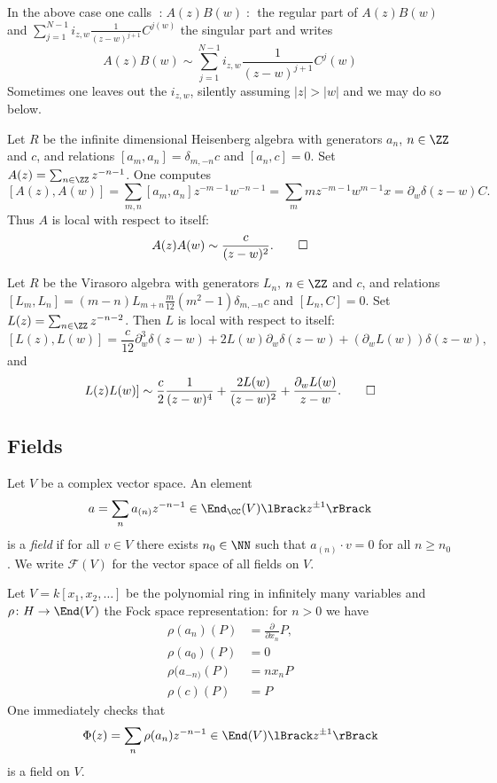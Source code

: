 \documentclass{ck-article}
\newcommand{\normord}[1]{\mathopen{:}#1\mathclose{:}}
\begin{document}
In the above case one calls $\normord{A(z)B(w)}$ the regular part of $A(z)B(w)$ and $\sum_{j=1}^{N-1} i_{z,w}\frac{1}{(z-w)^{j+1}} C^{j(w)}$ the singular part and writes
\[
    A(z)B(w) \sim \sum_{j=1}^{N-1} i_{z,w}\frac{1}{(z-w)^{j+1}} C^j(w)
\]
Sometimes one leaves out the $i_{z,w}$, silently assuming $|z| > |w|$ and we may do so below.

\begin{Example}
    Let $R$ be the infinite dimensional Heisenberg algebra with generators $a_n$, $n \in \ZZ$ and $c$, and relations $[a_m, a_n] = \delta_{m,-n}c$ and $[a_n, c] = 0$.
    Set $A(z) = \sum_{n \in \ZZ} z^{-n-1}$.
    One computes
    \[
        [A(z), A(w)] = \sum_{m, n} [a_m, a_n] z^{-m-1}w^{-n-1} = \sum_m m z^{-m-1}w^{m-1}x = \partial_w\delta(z-w)C.
    \]
    Thus $A$ is local with respect to itself:
    \[
        A(z)A(w) \sim \frac{c}{(z-w)^2}.
        \qedhere
    \]
\end{Example}

\begin{Example}
    Let $R$ be the Virasoro algebra with generators $L_n$, $n \in \ZZ$ and $c$, and relations $[L_m,L_n] = (m-n)L_{m+n} \frac{m}{12}(m^2-1)\delta_{m,-n}c$ and $[L_n, C] = 0$.
    Set $L(z) = \sum_{n \in \ZZ} z^{-n-2}$.
    Then $L$ is local with respect to itself:
    \[
        [L(z), L(w)] =
        \frac{c}{12} \partial_w^3\delta(z-w) + 2L(w)\partial_w\delta(z-w) + (\partial_wL(w))\delta(z-w),
    \]
    and
    \[
        L(z)L(w)] \sim
        \frac{c}{2} \frac{1}{(z-w)^4} + \frac{2L(w)}{(z-w)^2} + \frac{\partial_wL(w)}{z-w}.
        \qedhere
    \]
\end{Example}

\subsection{Fields}

\begin{Definition}
    Let $V$ be a complex vector space.
    An element
    \[
        a = \sum_n a_{(n)} z^{-n-1} \in \End_\CC(V)\lBrack z^{\pm1} \rBrack
    \]
    is a \emph{field} if for all $v \in V$ there exists $n_0 \in \NN$ such that $a_{(n)} \cdot v = 0$ for all $n \ge n_0$.
    We write $\mathcal F(V)$ for the vector space of all fields on $V$.
\end{Definition}

\begin{Example}\label{ex:heisenberg_field}
    Let $V = k[x_1,x_2,\dots]$ be the polynomial ring in infinitely many variables and $\rho\colon H \to \End(V)$ the Fock space representation:
    for $n > 0$ we have
    \begin{align*}
        \rho(a_n)(P) &= \frac{\partial}{\partial x_n}P, \\
        \rho(a_0)(P) & = 0 \\
        \rho(a_{-n)}(P) & = nx_nP \\
        \rho(c)(P) & = P
    \end{align*}
    One immediately checks that
    \[
        \Phi(z) = \sum_n \rho(a_n) z^{-n-1} \in \End(V)\lBrack z^{\pm1} \rBrack
    \]
    is a field on $V$.
\end{Example}
\end{document}
